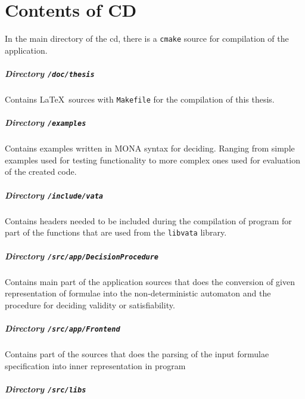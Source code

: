 \chapter{Contents of CD}

In the main directory of the cd, there is a \texttt{cmake} source for
compilation of the application.

\paragraph{Directory \texttt{/doc/thesis}}

Contains \LaTeX\ sources with \texttt{Makefile} for the compilation of
this thesis.

\paragraph{Directory \texttt{/examples}}

Contains examples written in \textsc{MONA} syntax for deciding. Ranging from
simple examples used for testing functionality to more complex ones used for
evaluation of the created code.

\paragraph{Directory \texttt{/include/vata}}

Contains headers needed to be included during the compilation of program for
part of the functions that are used from the \texttt{libvata} library.

\paragraph{Directory \texttt{/src/app/DecisionProcedure}}

Contains main part of the application sources that does the conversion of given
representation of formulae into the non-deterministic automaton and the
procedure for deciding validity or satisfiability.

\paragraph{Directory \texttt{/src/app/Frontend}}

Contains part of the sources that does the parsing of the input formulae
specification into inner representation in program

\paragraph{Directory \texttt{/src/libs}}

